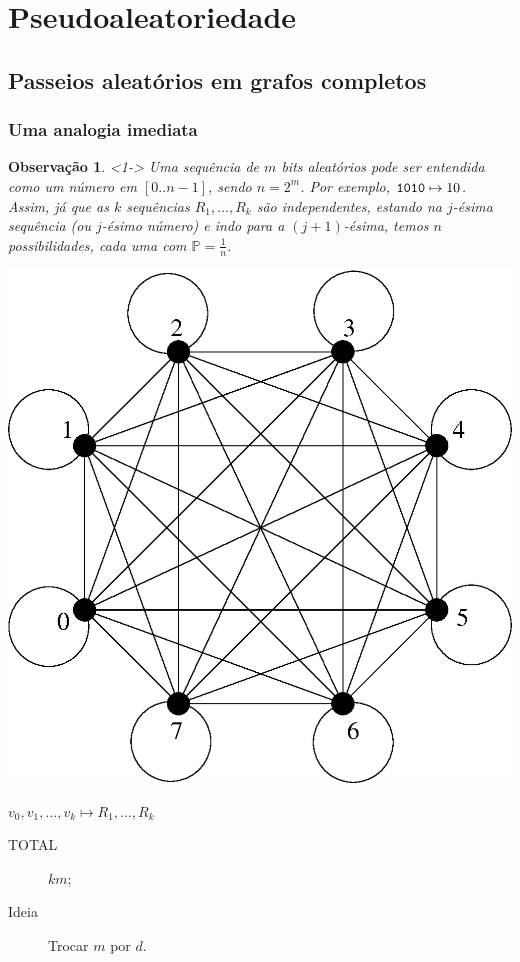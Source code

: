 \documentclass{beamer}
\def\Prob{\mathbb{P}} %
\theoremstyle{teoaxicorlem}
\theoremstyle{defnotnom}
\newtheorem{Obs}{Observação}
\begin{document}
\section{Pseudoaleatoriedade}

\subsection{Passeios aleatórios em grafos completos}

\begin{frame}
  \frametitle{Uma analogia imediata}
  \begin{Obs}<1->
    Uma sequência de $m$ \textit{bits}
    aleatórios pode ser entendida como um
    número em $[0..n-1]$, sendo $n=2^m$. Por exemplo,
    $\text{\texttt{1010}}\mapsto 10$. \pause
    Assim, já que as $k$ sequências $R_1,\dotsc,R_k$
    são independentes, estando na
    $j$-ésima sequência (ou $j$-ésimo número)
    e indo para a $(j+1)$-ésima,
    temos $n$ possibilidades, cada uma com $\Prob=\frac1n$.
  \end{Obs}
  \vfill\pause
  \parbox{.4\linewidth}{
    \centering
    \includegraphics[height=0.3\paperheight]{k8.eps}
  }\hfill
  \parbox{.5\linewidth}{
    $v_0, v_1, \dotsc, v_k \mapsto R_1,\dotsc,R_k$\pause
    \begin{description}
    \item[TOTAL] $km$;\pause
    \item[Ideia] Trocar $m$ por $d$.
    \end{description}
  }
\end{frame}
\end{document}
